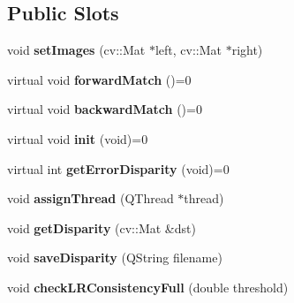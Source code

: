 \subsection*{Public Slots}
\begin{DoxyCompactItemize}
\item 
\hypertarget{class_abstract_stereo_matcher_a9d1270578e9ea21b31db33a8e9956675}{}void {\bfseries set\+Images} (cv\+::\+Mat $\ast$left, cv\+::\+Mat $\ast$right)\label{class_abstract_stereo_matcher_a9d1270578e9ea21b31db33a8e9956675}

\item 
\hypertarget{class_abstract_stereo_matcher_aaccfe2a4402687f8a51349976b49c94a}{}virtual void {\bfseries forward\+Match} ()=0\label{class_abstract_stereo_matcher_aaccfe2a4402687f8a51349976b49c94a}

\item 
\hypertarget{class_abstract_stereo_matcher_a4e2bc164538e6dab3d31dcee275031b0}{}virtual void {\bfseries backward\+Match} ()=0\label{class_abstract_stereo_matcher_a4e2bc164538e6dab3d31dcee275031b0}

\item 
\hypertarget{class_abstract_stereo_matcher_afb869f34062416ce17246598e2b77090}{}virtual void {\bfseries init} (void)=0\label{class_abstract_stereo_matcher_afb869f34062416ce17246598e2b77090}

\item 
\hypertarget{class_abstract_stereo_matcher_a87525ed38b36c37d2eda34c0e2d321d7}{}virtual int {\bfseries get\+Error\+Disparity} (void)=0\label{class_abstract_stereo_matcher_a87525ed38b36c37d2eda34c0e2d321d7}

\item 
\hypertarget{class_abstract_stereo_matcher_a124604c16466bac10a308436dd2f07db}{}void {\bfseries assign\+Thread} (Q\+Thread $\ast$thread)\label{class_abstract_stereo_matcher_a124604c16466bac10a308436dd2f07db}

\item 
\hypertarget{class_abstract_stereo_matcher_a2b1a5e9841f39988686450b1f1721032}{}void {\bfseries get\+Disparity} (cv\+::\+Mat \&dst)\label{class_abstract_stereo_matcher_a2b1a5e9841f39988686450b1f1721032}

\item 
\hypertarget{class_abstract_stereo_matcher_a80c14c977bd44695d1142eaef8abdcb3}{}void {\bfseries save\+Disparity} (Q\+String filename)\label{class_abstract_stereo_matcher_a80c14c977bd44695d1142eaef8abdcb3}

\item 
\hypertarget{class_abstract_stereo_matcher_ac89bdb7ff8010eb3cffc22ae73dd5436}{}void {\bfseries check\+L\+R\+Consistency\+Full} (double threshold)\label{class_abstract_stereo_matcher_ac89bdb7ff8010eb3cffc22ae73dd5436}


\end{DoxyCompactItemize}
